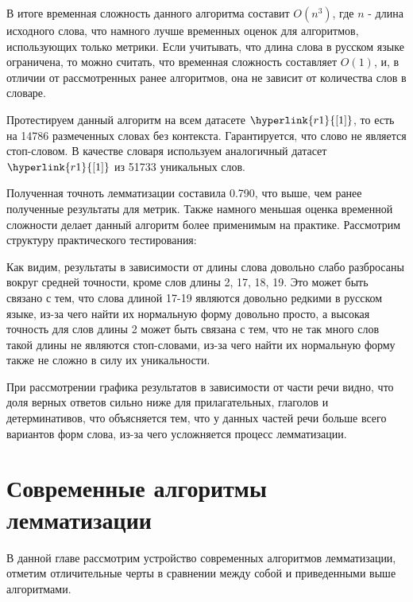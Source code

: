 \documentclass[12pt, a4paper]{article}
\begin{document}
В итоге временная сложность данного алгоритма составит $O(n^3)$, где $n$ - длина исходного слова, что намного лучше временных оценок для алгоритмов, использующих только метрики. Если учитывать, что длина слова в русском языке ограничена, то можно считать, что временная сложность составляет $O(1)$, и, в отличии от рассмотренных ранее алгоритмов, она не зависит от количества слов в словаре.

Протестируем данный алгоритм на всем датасете $\hyperlink{r1}{[1]}$, то есть на 14786 размеченных словах без контекста. Гарантируется, что слово не является стоп-словом. В качестве словаря используем аналогичный датасет $\hyperlink{r1}{[1]}$ из 51733 уникальных слов.

Полученная точноть лемматизации составила 0.790, что выше, чем ранее полученные результаты для метрик. Также намного меньшая оценка временной сложности делает данный алгоритм более применимым на практике. Рассмотрим структуру практического тестирования:

\begin{figure}[htp]
\label{ris:Prefix_Trie_alg_res.png}
\end{figure}

Как видим, результаты в зависимости от длины слова довольно слабо разбросаны вокруг средней точности, кроме слов длины 2, 17, 18, 19. Это может быть связано с тем, что слова длиной 17-19 являются довольно редкими в русском языке, из-за чего найти их нормальную форму довольно просто, а высокая точность для слов длины 2 может быть связана с тем, что не так много слов такой длины не являются стоп-словами, из-за чего найти их нормальную форму также не сложно в силу их уникальности.

При рассмотрении графика результатов в зависимости от части речи видно, что доля верных ответов сильно ниже для прилагательных, глаголов и детерминативов, что объясняется тем, что у данных частей речи больше всего вариантов форм слова, из-за чего усложняется процесс лемматизации. 

\section{Современные алгоритмы лемматизации}
\quad В данной главе рассмотрим устройство современных алгоритмов лемматизации, отметим отличительные черты в сравнении между собой и приведенными выше алгоритмами.
\end{document}
